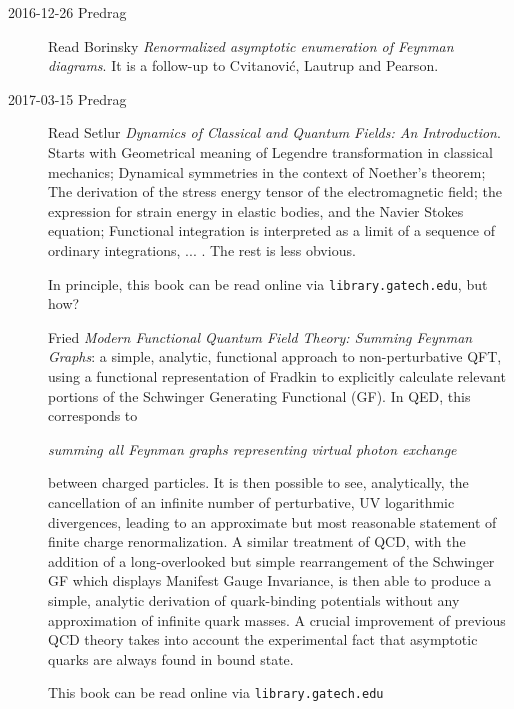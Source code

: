 \begin{description}
\item[2016-12-26 Predrag] Read
Borinsky
{\em Renormalized asymptotic enumeration of {Feynman} diagrams}.
It is a follow-up to Cvitanovi\'c, Lautrup and Pearson.

\item[2017-03-15 Predrag] Read
Setlur
{\em Dynamics of Classical and Quantum Fields: An Introduction}.
Starts with
Geometrical meaning of Legendre transformation in classical mechanics;
Dynamical symmetries in the context of Noether’s theorem;
The derivation of the stress energy tensor of the electromagnetic field;
the expression for strain energy in elastic bodies, and the Navier Stokes
equation;
Functional integration is interpreted as a limit of a sequence of
ordinary integrations, ... .
The rest is less obvious.

In principle, this book can be read online via
\texttt{library.gatech.edu}, but how?

Fried
{\em Modern Functional Quantum Field Theory: Summing Feynman Graphs}:
a simple, analytic, functional approach to non-perturbative QFT, using a
functional representation of Fradkin to explicitly
calculate relevant portions of the Schwinger Generating Functional (GF).
In QED, this corresponds to

\emph{summing all Feynman graphs representing virtual photon exchange}

between charged particles. It is then possible to
see, analytically, the cancellation of an infinite number of
perturbative, UV logarithmic divergences, leading to an approximate but
most reasonable statement of finite charge renormalization. A similar
treatment of QCD, with the addition of a long-overlooked but simple
rearrangement of the Schwinger GF which displays Manifest Gauge
Invariance, is then able to produce a simple, analytic derivation of
quark-binding potentials without any approximation of infinite quark
masses. A crucial improvement of previous QCD theory takes into account
the experimental fact that asymptotic quarks are always found in bound
state.

This book can be read online via \texttt{library.gatech.edu}



\end{description}
\em
